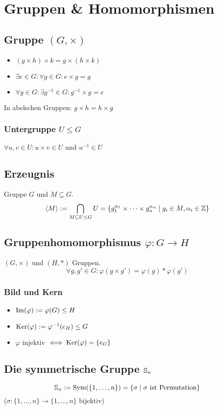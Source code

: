 \section*{Gruppen \& Homomorphismen}

\subsection*{Gruppe $(G,\times)$}
\begin{itemize}
	\item $(g \times h) \times k = g \times (h \times k)$
	\item $\exists e \in G: \forall g\in G: e\times g = g$
	\item $\forall g\in G: \exists g^{-1}\in G: g^{-1} \times g = e$
\end{itemize}
In abelschen Gruppen: $g\times h = h \times g$

\subsubsection*{Untergruppe $U\le G$}
$\forall u,v\in U: u\times v \in U$ und $u^{-1}\in U$

\subsection*{Erzeugnis}
Gruppe $G$ und $M \subseteq G$.
\[
	\langle M \rangle := \bigcap_{M\subseteq U \le G}U
	= \{g_1^{\alpha_1}\times\cdots\times g_n^{\alpha_n} \mid g_i\in M,\alpha_i\in\Z\}
\]

\subsection*{Gruppenhomomorphismus $\varphi:G \to H$}
$(G, \times)$ und $(H, *)$ Gruppen.
\[\forall g,g'\in G: \varphi(g\times g')=\varphi(g) * \varphi(g')\]

\subsubsection*{Bild und Kern}
\begin{itemize}
	\item $\im(\varphi):=\varphi(G) \le H$
	\item $\Ker(\varphi) := \varphi^{-1}(e_H) \le G$
	\item $\varphi$ injektiv $\iff \Ker(\varphi)=\{e_G\}$
\end{itemize}

\subsection*{Die symmetrische Gruppe $\S_n$}
\[\S_n := \Sym(\{1,\dots,n\})=\{\sigma \mid \sigma \text{ ist Permutation}\}\]
($\sigma : \{1,\dots,n\}\to\{1,\dots,n\}$ bijektiv)

